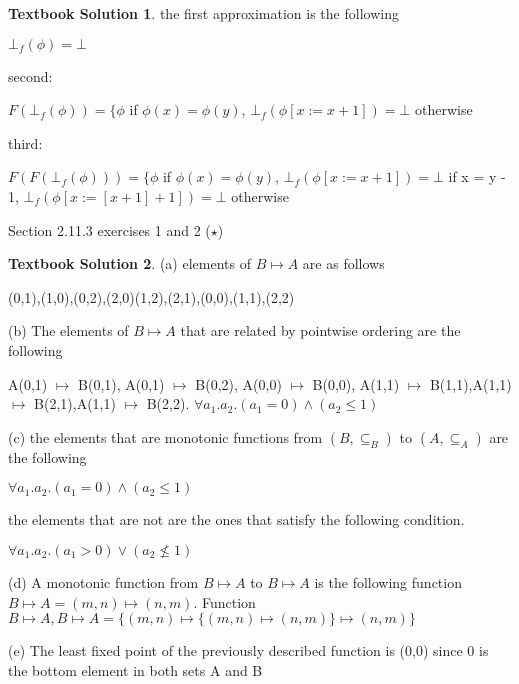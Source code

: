 \documentclass[10pt]{article}
\theoremstyle{definition}
\newtheorem{ts}{Textbook Solution}
\begin{document}
  

  \begin{ts}

  the first approximation is the following

  

  $\bot_f (\phi) = \bot$

  

  second:

  

  $F(\bot_f (\phi)) = \{ \phi$ if $\phi(x) = \phi(y)$, $\bot_f(\phi[x := x + 1]) = \bot$ otherwise

  

  third:

  

  $F(F(\bot_f (\phi))) = \{ \phi$ if $\phi(x) = \phi(y)$, $\bot_f(\phi[x := x + 1]) = \bot$ if x = y - 1, $\bot_f(\phi[x := [x + 1] + 1]) = \bot$ otherwise

  

  

  

  \end{ts}

  

  

  

  Section 2.11.3 exercises 1 and 2 ($\star$)

  

  \begin{ts}

  

  (a) elements of $ B \mapsto A$ are as follows

  

  (0,1),(1,0),(0,2),(2,0)(1,2),(2,1),(0,0),(1,1),(2,2)

  

  (b) The elements of $ B \mapsto A$ that are related by pointwise ordering are the following

  

  A(0,1) $\mapsto$ B(0,1), A(0,1) $\mapsto$ B(0,2), A(0,0) $\mapsto$ B(0,0), A(1,1) $\mapsto$ B(1,1),A(1,1) $\mapsto$ B(2,1),A(1,1) $\mapsto$ B(2,2). 
  $ \forall a_1.a_2. (a_1 = 0) \wedge (a_2 \leq 1) $
  

  (c) the elements that are monotonic functions from $(B,\subseteq_B)$ to $(A,\subseteq_A)$ are the following
    
    $ \forall a_1.a_2. (a_1 = 0) \wedge (a_2 \leq 1) $
    
    the elements that are not are the ones that satisfy the following condition.
    
    $ \forall a_1.a_2. (a_1 > 0) \vee (a_2 \not \leq 1) $

  

  (d) A monotonic function from $B \mapsto A$ to $B \mapsto A$ is the following
    function $B \mapsto A = (m,n) \mapsto (n,m)$. Function $B \mapsto A, B \mapsto A= \{(m,n) \mapsto \{(m,n) \mapsto (n,m)\} \mapsto (n,m)\}$
  
  (e) The least fixed point of the previously described function is (0,0) since 0 is the bottom element in both sets A and B

  \end{ts}
  
\end{document}
